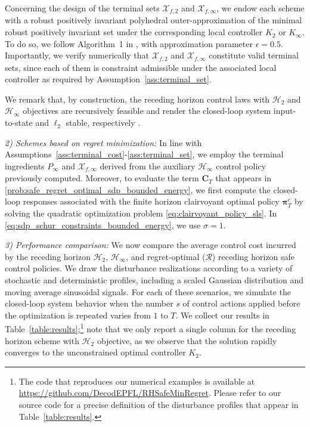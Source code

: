 \documentclass[conference]{IEEEtran}
\begin{document}
Concerning the design of the terminal  sets $\mathcal{X}_{f,2}$ and $\mathcal{X}_{f,\infty}$, we endow each scheme with a robust positively invariant polyhedral outer-approximation of the minimal robust positively invariant set under the corresponding local controller $K_2$ or $K_\infty$. To do so, we follow Algorithm~1 in \cite{rakovic2005invariant}, with approximation parameter $\epsilon = 0.5$. Importantly, we verify numerically that $\mathcal{X}_{f,2}$ and $\mathcal{X}_{f,\infty}$ constitute valid terminal sets, since each of them is constraint admissible under the associated local controller as required by Assumption~\ref{ass:terminal_set}.

We remark that, by construction, the receding horizon control laws with $\mathcal{H}_2$ and $\mathcal{H}_\infty$ objectives are recursively feasible and render the closed-loop system input-to-state and $\ell_2$ stable, respectively \cite[Th. 4.20, Th. 5.15]{goulart2007affine}.

\emph{2) Schemes based on regret minimization:} In line with Assumptions~\ref{ass:terminal_cost}-\ref{ass:terminal_set}, we employ the terminal ingredients $P_\infty$ and $\mathcal{X}_{f, \infty}$ derived from the auxiliary $\mathcal{H}_\infty$ control policy previously computed. Moreover, to evaluate the term $\mathbf{C}_T$ that appears in \eqref{prob:safe_regret_optimal_sdp_bounded_energy}, we first compute the closed-loop responses associated with the finite horizon clairvoyant optimal policy $\bm{\pi}^c_T$ by solving the quadratic optimization problem \eqref{eq:clairvoyant_policy_sls}. In \eqref{eq:sdp_schur_constraints_bounded_energy}, we use $\sigma = 1$.

\emph{3) Performance comparison:}
We now compare the average control cost incurred by the receding horizon $\mathcal{H}_2$, $\mathcal{H}_\infty$, and regret-optimal ($\mathcal{R}$) receding horizon safe control policies. We draw the disturbance realizations according to a variety of stochastic and deterministic profiles, including a scaled Gaussian distribution and moving average sinusoidal signals. For each of these scenarios, we simulate the closed-loop system behavior when the number $s$ of control actions applied before the optimization is repeated varies from $1$ to $T$. We collect our results in Table~\ref{table:results};\footnote{The code that reproduces our numerical examples is available at \href{https://github.com/DecodEPFL/RHSafeMinRegret}{https://github.com/DecodEPFL/RHSafeMinRegret}. Please refer to our source code for a precise definition of the disturbance profiles that appear in Table~\ref{table:results}.} note that we only report a single column for the receding horizon scheme with $\mathcal{H}_2$ objective, as we observe that the solution rapidly converges to the unconstrained optimal controller $K_2$.
\end{document}
